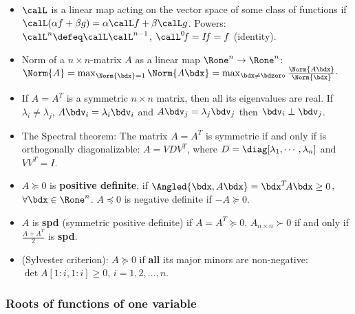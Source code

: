 \documentclass[a4paper]{article}
\begin{document}
\begin{itemize}

   \item $\calL$ is a linear map acting on the vector space of some class of functions if
     $\calL (\alpha f+\beta g)=\alpha\calL f+\beta\calL g$.
     Powers: $\calL^n\defeq\calL\calL^{n-1}$,
     $\calL^0\!f=I\!f=f$ (identity).

  \item Norm of a $n\times n$-matrix $A$ as a linear map $\Rone^n\to\Rone^n$:
    $\Norm{A}
    =\max_{\Norm{\bdx}=1} \Norm{A\bdx}
    =\max_{\bdx\neq\bdzero} \frac{\Norm{A\bdx}}{\Norm{\bdx}}\cdot
    $

  \item If $A=A^T$ is a symmetric $n\times n$ matrix,
    then all its eigenvalues are real.
    If
    $\lambda_i\neq \lambda_j$,
    $A\bdv_i=\lambda_i\bdv_i$
    and
    $A\bdv_j=\lambda_j\bdv_j$
    then
    $\bdv_i\perp\bdv_j$.
  \item
    The Spectral theorem: The matrix $A=A^T$ is symmetric
    if and only if is orthogonally diagonalizable:
    $A=VDV^T$,
    where
    $D=\diag[\lambda_1,\cdots,\lambda_n]$
    and
    $VV^T=I$.

  \item
    $A\succeq0$ is
    \textbf{positive definite}, if
    $\Angled{\bdx,A\bdx}=\bdx^T\!A\bdx\ge0$, $\forall\bdx\in\Rone^n$.
    $A\preceq0$ is negative definite if $-A\succeq0$.

  \item $A$ is \textbf{spd} (symmetric positive definite) if $A=A^T\succeq0$.
    $A_{n\times n}\succ 0$ if and only if \/ $\frac{A+A^T}{2}$ \/ is \textbf{spd}.

  \item (Sylvester criterion): $A\succeq 0$ if \textbf{all} its major minors are non-negative:
    $\det A[1:i,1:i]\ge 0$, $i=1,2,\ldots,n$.

\end{itemize}%

\subsubsection*{Roots of functions of one variable}%
\end{document}
